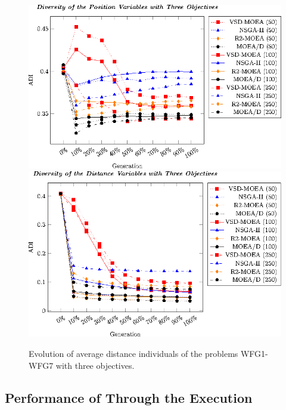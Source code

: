 \begin{figure}[t]
\centering
%
\includegraphics[]{Images/Graphic-Diversity_3obj_tikz-figure0.eps} \\[0.2cm]
\includegraphics[]{Images/Graphic-Diversity_3obj_tikz-figure1.eps}
\caption{Evolution of average distance individuals of the problems WFG1-WFG7 with three objectives.}\label{fig:Diversity_3obj}
\end{figure}
%

\subsection{Performance of \MOEAS{} Through the Execution}



